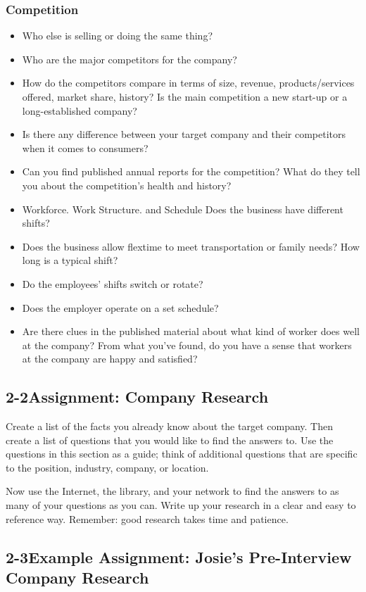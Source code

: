 \subsubsection*{Competition}
\begin{itemize}[leftmargin=1.0cm]
	\item Who else is selling or doing the same thing?
	\item Who are the major competitors for the company?
	\item How do the competitors compare in terms of size, revenue, products/services offered, market share, history? Is the main competition a new start-up or a long-established company?
	\item Is there any difference between your target company and their competitors when it comes to consumers?
	\item Can you find published annual reports for the competition? What do they tell you about the competition's health and history?
	\item Workforce. Work Structure. and Schedule Does the business have different shifts?
	\item Does the business allow flextime to meet transportation or family needs? How long is a typical shift?
	\item Do the employees' shifts switch or rotate?
	\item Does the employer operate on a set schedule?
	\item Are there clues in the published material about what kind of worker does well at the company? From what you've found, do you have a sense that workers at the company are happy and satisfied?
\end{itemize}
\pagebreak \subsection*{2-2\quad Assignment: Company Research}
Create a list of the facts you already know about the target company. Then create a list of questions that you would like to find the answers to. Use the questions in this section as a guide; think of additional questions that are specific to the position, industry, company, or location.

Now use the Internet, the library, and your network to find the answers to as many of your questions as you can. Write up your research in a clear and easy to reference way. Remember: good research takes time and patience.
\pagebreak \subsection*{2-3\quad Example Assignment: Josie's Pre-Interview Company Research}

